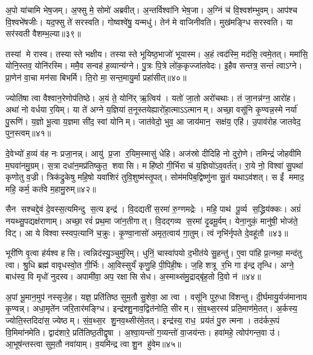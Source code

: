 अ॒पो या॑चामि भेष॒जम्। अ॒फ्सु मे॒ सोमो॑ अब्रवीत्। अ॒न्तर्विश्वा॑नि भेष॒जा। अ॒ग्निं च॑ वि॒श्वश॑म्भुवम्। आप॑श्च वि॒श्वभे॑षजीः। यद॒फ्सु ते॑ सरस्वति। गोष्वश्वे॑षु॒ यन्मधु॑। तेन॑ मे वाजिनीवति। मुख॑मङ्ग्धि सरस्वति। या सर॑स्वती वैशम्भ॒ल्या॥३९॥

तस्यां मे रास्व। तस्यास्ते भक्षीय। तस्यास्ते भूयिष्ठ॒भाजो॑ भूयास्म। अ॒हं त्वद॑स्मि॒ मद॑सि॒ त्वमे॒तत्। ममा॑सि॒ योनि॒स्तव॒ योनि॑रस्मि। ममै॒व सन्वह॑ ह॒व्यान्य॑ग्ने। पु॒त्रः पि॒त्रे लो॑क॒कृज्जा॑तवेदः। इ॒हैव सन्तत्र॒ सन्तं॑ त्वाऽग्ने। प्रा॒णेन॑ वा॒चा मन॑सा बिभर्मि। ति॒रो मा॒ सन्त॒मायु॒र्मा प्रहा॑सीत्॥४०॥

ज्योति॑षा त्वा वैश्वान॒रेणोप॑तिष्ठे। अ॒यं ते॒ योनि॑र् ऋ॒त्विय॑। यतो॑ जा॒तो अरो॑चथाः। तं जा॒नन्न॑ग्न॒ आरो॑ह। अथा॑ नो वर्धया र॒यिम्। या ते॑ अग्ने य॒ज्ञिया॑ त॒नूस्तयेह्यारो॑हा॒त्माऽऽत्मानम्। अच्छा॒ वसू॑नि कृ॒ण्वन्न॒स्मे नर्या॑ पु॒रूणि॑। य॒ज्ञो भू॒त्वा य॒ज्ञमा सी॑द॒ स्वां योनिम्। जात॑वेदो॒ भुव॒ आ जाय॑मान॒ सक्ष॑य॒ एहि॑। उ॒पाव॑रोह जातवेद॒ पुन॒स्त्वम्॥४१॥

दे॒वेभ्यो॑ ह॒व्यं व॑ह नः प्रजा॒नन्न्। आयु॑ प्र॒जा र॒यिम॒स्मासु॑ धेहि। अज॑स्रो दीदिहि नो दुरो॒णे। तमिन्द्रं॑ जोहवीमि म॒घवा॑नमु॒ग्रम्। स॒त्रा दधा॑न॒मप्र॑तिष्कुत॒ शवासि। महि॑ष्ठो गी॒र्भिरा च॑ य॒ज्ञियो॑ऽव॒वर्त॑त्। रा॒ये नो॒ विश्वा॑ सु॒पथा॑ कृणोतु व॒ज्री। त्रिक॑द्रुकेषु महि॒षो यवा॑शिरं तुवि॒शुष्म॑स्तृ॒पत्। सोम॑मपिब॒द्विष्णु॑ना सु॒तं यथाऽव॑शत्। स ईं ममाद॒ महि॒ कर्म॒ कर्त॑वे म॒हामु॒रुम्॥४२॥

सैन सश्चद्दे॒वं दे॒वस्स॒त्यमिन्दु स॒त्य इन्द्र॑। वि॒दद्यती॑ स॒रमा॑ रु॒ग्णमद्रेः। महि॒ पाथ॑ पू॒र्व्य स॒द्ध्रिय॑क्कः। अग्रं॑ नयथ्सु॒पद्यक्ष॑राणाम्। अच्छा॒ रवं॑ प्रथ॒मा जा॑न॒तीगात्। वि॒दद्गव्य स॒रमा॑ दृ॒ढमू॒र्वम्। येना॒नुकं॒ मानु॑षी॒ भोज॑ते॒ विट्। आ ये विश्वास्स्वप॒त्यानि॑ च॒क्रुः। कृ॒ण्वा॒नासो॑ अमृत॒त्वाय॑ गा॒तुम्। त्वं नृभि॑र्नृपते दे॒वहू॑तौ ॥४३॥

भूरी॑णि वृ॒त्वा ह॑र्यश्व हसि। त्वन्निद॑स्यु॒ञ्चुमु॑रिम्। धुनिं॒ चास्वा॑पयो द॒भीत॑ये सु॒हन्तु॑। ए॒वा पा॑हि प्र॒त्नथा॒ मन्द॑तु त्वा। श्रु॒धि ब्रह्म॑ वावृधस्वो॒त गी॒र्भिः। आ॒विस्सुर्यं॑ कृणु॒हि पी॒पिही॒षः। ज॒हि शत्रू र॒भि गा इ॑न्द्र तृन्धि। अग्ने॒ बाध॑स्व॒ वि मृधो॑ नुदस्व। अपामी॑वा॒ अप॒ रक्षासि सेध। अ॒स्माथ्स॑मु॒द्राद्बृ॑ह॒तो दि॒वो न॑॥४४॥

अ॒पां भू॒मान॒मुप॑ नस्सृजे॒ह। यज्ञ॒ प्रति॑तिष्ठ सुम॒तौ सु॒शेवा॒ आ त्वा। वसू॑नि पुरु॒धा वि॑शन्तु। दी॒र्घमायु॒र्यज॑मानाय कृ॒ण्वन्न्। अधा॒मृते॑न जरि॒तार॑मङ्ग्धि। इन्द्र॑श्शु॒नाव॒द्वित॑नोति॒ सीरम्। सं॒व॒थ्स॒रस्य॑ प्रति॒माण॑मे॒तत्। अ॒र्कस्य॒ ज्योति॒स्तदिदा॑स॒ ज्येष्ठम्। सं॒व॒थ्स॒र शु॒नव॒थ्सीर॑मे॒तत्। इन्द्र॑स्य॒ राध॒ प्रय॑तं पु॒रु त्मना। तद॑र्करू॒पं वि॒मिमा॑नमेति। द्वाद॑शारे॒ प्रति॑तिष्ठ॒तीद्वृषा। अ॒श्वा॒यन्तो॑ ग॒व्यन्तो॑ वा॒जय॑न्तः। हवा॑महे॒ त्वोप॑गन्त॒वा उ॑। आ॒भूष॑न्तस्त्वा सुम॒तौ नवा॑याम्। व॒यमि॑न्द्र त्वा शु॒न हु॑वेम॥४५॥

